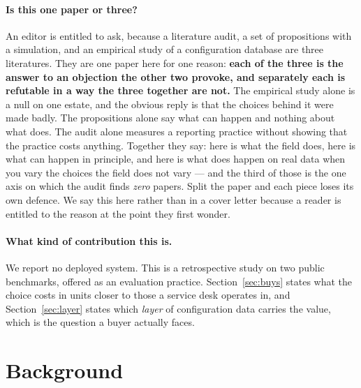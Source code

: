\documentclass[preprint,12pt]{elsarticle}
\begin{document}
\paragraph{Is this one paper or three?}
An editor is entitled to ask, because a literature audit, a set of
propositions with a simulation, and an empirical study of a configuration
database are three literatures. They are one paper here for one reason:
\textbf{each of the three is the answer to an objection the other two
provoke, and separately each is refutable in a way the three together are
not.} The empirical study alone is a null on one estate, and the obvious reply
is that the choices behind it were made badly. The propositions alone say what
can happen and nothing about what does. The audit alone measures a reporting
practice without showing that the practice costs anything. Together they say:
here is what the field does, here is what can happen in principle, and here is
what does happen on real data when you vary the choices the field does not
vary --- and the third of those is the one axis on which the audit finds
\emph{zero} papers. Split the paper and each piece loses its own defence. We
say this here rather than in a cover letter because a reader is entitled to
the reason at the point they first wonder.

\paragraph{What kind of contribution this is.}
We report no deployed system. This is a retrospective study on two public
benchmarks, offered as an evaluation practice.
Section~\ref{sec:buys} states what the choice costs in units closer to those
a service desk operates in, and Section~\ref{sec:layer} states which
\emph{layer} of configuration data carries the value, which is the question a
buyer actually faces.

\section{Background}
\label{sec:background}
\end{document}

